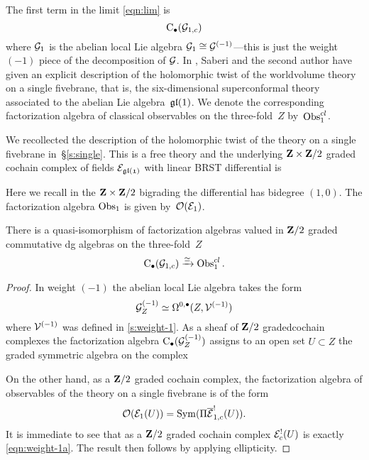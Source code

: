 The first term in the limit \eqref{eqn:lim} is 
\[
{\rm C}_\bullet(\mathcal G_{1,c})
\]
where $\mathcal G_1$ is the abelian local Lie algebra $\mathcal G_{1} \cong \mathcal G^{(-1)}$---this is just the weight $(-1)$ piece of the decomposition of $\mathcal G$. 
In \cite{SWtensor}, Saberi and the second author have given an explicit description of the holomorphic twist of the worldvolume theory on a single fivebrane, that is, the six-dimensional superconformal theory associated to the abelian Lie algebra~$\mathfrak{gl}(1)$.
We denote the corresponding factorization algebra of classical observables on the three-fold~$Z$ by~$\operatorname{Obs}^{cl}_1$.

We recollected the description of the holomorphic twist of the theory on a single fivebrane in~\S\ref{s:single}. 
This is a free theory and the underlying $\mathbf{Z} \times \mathbf{Z}/2$ graded cochain complex of fields $\mathcal E_{\mathfrak{gl(1)}}$ with linear BRST differential is
\beqn
{} 
\eeqn
Here we recall in the $\mathbf{Z} \times \mathbf{Z}/2$ bigrading the differential has bidegree $(1,0)$. 
The factorization algebra $\operatorname{Obs}_1$ is given by~$\mathcal O(\mathcal E_1)$.

\begin{prop}
\label{prop:factabelian}
There is a quasi-isomorphism of factorization algebras valued in $\mathbf{Z}/2$ graded commutative dg algebras on the three-fold~$Z$
\[
{\rm C}_\bullet(\mathcal G_{1,c}) \xrightarrow{\simeq} \operatorname{Obs}^{cl}_{1} .
\]
\end{prop}

\begin{proof}
In weight $(-1)$ the abelian local Lie algebra takes the form
\[
\mathcal G_Z^{(-1)} \simeq \Omega^{0,\bullet}(Z,\mathcal V^{(-1)}) 
\]
where $\mathcal V^{(-1)}$ was defined in \ref{s:weight-1}.
As a sheaf of $\mathbf{Z}/2$ gradedcochain complexes the factorization algebra ${\rm C}_\bullet(\mathcal G_Z^{(-1)})$ assigns to an open set $U\subset Z$ the graded symmetric algebra on the complex
\beqn\label{eqn:weight-1a}
\eeqn
On the other hand, as a $\mathbf{Z}/2$ graded cochain complex, the factorization algebra of observables of the theory on a single fivebrane is of the form 
\[
\mathcal O(\mathcal E_{1}(U)) = \operatorname{Sym}(\Pi \overline{\mathcal E}_{1,c}^!(U)) .
\]
It is immediate to see that as a $\mathbf{Z}/2$ graded cochain complex $\mathcal E_c^!(U)$ is exactly \eqref{eqn:weight-1a}.
The result then follows by applying ellipticity.
\end{proof}

